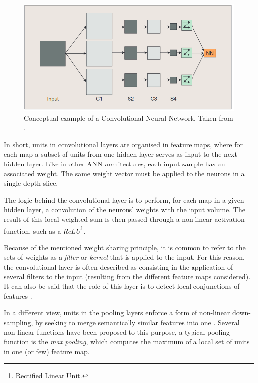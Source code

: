 \documentclass[9pt,journal,compsoc]{IEEEtran}
\begin{document}
\begin{figure}[ht]
	\centering
	\includegraphics[scale=0.2]{Convolutional_Neural_Net.png}
	\caption{Conceptual example of a Convolutional Neural Network. Taken from \cite{arel2010deep}.}
	\label{convolutional_neural_net}
\end{figure}

In short, units in convolutional layers are organised in feature maps, where for each map a subset of units from one hidden layer serves as input to the next hidden layer. Like in other ANN architectures, each input sample has an associated weight. The same weight vector must be applied to the neurons in a single depth slice.

The logic behind the convolutional layer is to perform, for each map in a given hidden layer, a convolution of the neurons' weights with the input volume. The result of this local weighted sum is then passed through a non-linear activation function, such as a \emph{ReLU}\footnote{Rectified Linear Unit.}.

Because of the mentioned weight sharing principle, it is common to refer to the sets of weights as a \emph{filter} or \emph{kernel} that is applied to the input. For this reason, the convolutional layer is often described as consisting in the application of several filters to the input (resulting from the different feature maps considered). It can also be said that the role of this layer is to detect local conjunctions of features \cite{lecun2015deep}.

In a different view, units in the pooling layers enforce a form of non-linear down-sampling, by seeking to merge semantically similar features into one \cite{lecun2015deep}. Several non-linear functions have been proposed to this purpose, a typical pooling function is the \emph{max pooling}, which computes the maximum of a local set of units in one (or few) feature map.
\end{document}

